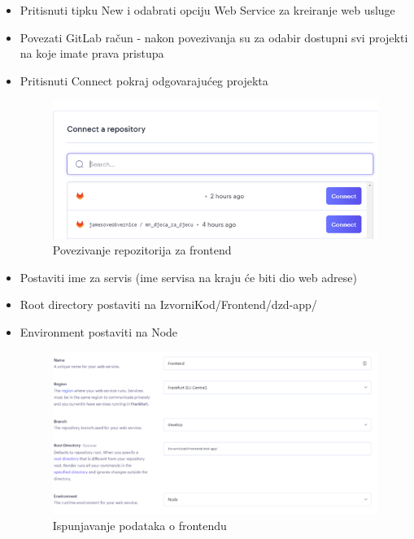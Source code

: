                 \begin{itemize}
                    \item Pritisnuti tipku New i odabrati opciju Web Service za kreiranje web usluge
                    \item Povezati GitLab račun - nakon povezivanja su za odabir dostupni svi projekti na koje imate prava pristupa
                    \item Pritisnuti Connect pokraj odgovarajućeg projekta
                    \begin{figure}[H]
    			\includegraphics[width=\textwidth,height=0.25\textheight]{slike/connectFront.png}
    			\centering
    			\caption{Povezivanje repozitorija za frontend}
    			\label{fig:connectRepoFront}
    			\end{figure}
                    \item Postaviti ime za servis (ime servisa na kraju će biti dio web adrese)
                    \item Root directory postaviti na IzvorniKod/Frontend/dzd-app/
                    \item Environment postaviti na Node
                    \begin{figure}[H]
    			\includegraphics[scale=0.75]{slike/fillDataDeployFront.png}
    			\centering
    			\caption{Ispunjavanje podataka o frontendu}

\end{figure}
\end{itemize}

